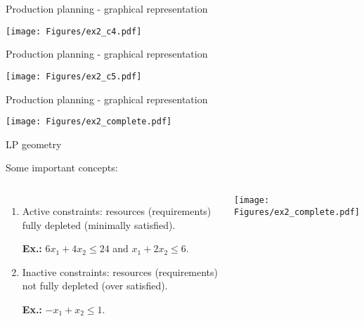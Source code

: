 \begin{frame}{Production planning - graphical representation}

\center
\texttt{[image: Figures/ex2\_c4.pdf]}

\end{frame}


\begin{frame}{Production planning - graphical representation}

\center
\texttt{[image: Figures/ex2\_c5.pdf]}

\end{frame}


\begin{frame}{Production planning - graphical representation}

\center
\texttt{[image: Figures/ex2\_complete.pdf]}

\end{frame}


\begin{frame}{LP geometry}

Some important concepts:
\begin{columns}

\begin{enumerate}[<+->]
\item \alert{Active constraints:} resources (requirements) fully depleted (minimally satisfied).

{\bf Ex.:} {\color{blue}$6x_1 + 4x_2 \leq 24$} and \alert{$x_1 + 2x_2 \leq 6$}.   

\item \alert{Inactive constraints:} resources (requirements) not fully depleted (over satisfied).

{\bf Ex.:} {\color{green}$-x_1 + x_2 \leq 1$}.
\end{enumerate}

\hspace{-0.25cm}
\texttt{[image: Figures/ex2\_complete.pdf]}

\end{columns}
\vspace{-6pt}

\end{frame}


